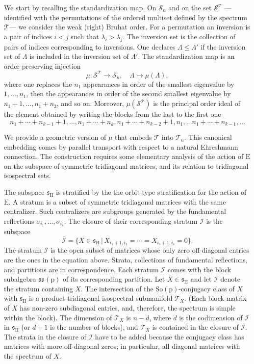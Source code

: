 \documentclass[reqno]{amsart}
\newcommand{\p}{\mathrm{p}}
\renewcommand{\ss}{\mathfrak{s}}
\newcommand{\so}{\mathfrak{so}}
\newcommand{\cI}{\mathcal{I}}
\newcommand{\cS}{\mathcal{S}}
\newcommand{\cT}{\mathcal{T}}
\newcommand{\E}{\mathrm{E}}
\newcommand{\So}{\mathrm{So}}
\renewcommand{\H}{\mathrm{H}}
\begin{document}
We start by recalling the standardization map.
On $\cS_n$ and on the set $\mathcal{S}^{\cT}$ ---identified with the  permutations of the ordered multiset defined by the spectrum  $\cT$--- we consider the weak (right) Bruhat order. For a permutation an inversion is a pair of indices $i<j$ such that $\lambda_i>\lambda_j$. The inversion set is the collection of pairs of indices corresponding to inversions. One declares $\Lambda\leq \Lambda'$ if the inversion set of $\Lambda$ is included in the inversion set of $\Lambda'$.  The standardization map   \cite[Theorem 8]{BB}  is an order preserving injection
\begin{equation}\label{eq:order-embdedding}
\mu: \cS^{\cT}\to \mathcal{S}_{n},\quad \Lambda\mapsto  \mu(\Lambda),
\end{equation}
where one replaces the $n_1$ appearances in order of the smallest eigenvalue by $1,\dots,n_1$, then the appearances in order of the second smallest eigenvalue by $n_1+1,\dots, n_1+n_2$, and so on.
Moreover, $\mu(\mathcal{S}^{\cT})$ is the  principal order ideal of the element obtained by writing the blocks from the last to the first one
\[n_1+\cdots +n_{k-1}+1,\dots ,n_1+\cdots +n_{k},n_1+\cdots +n_{k-2}+1,n_1,\dots n_1+\cdots +n_{k-1},\dots\]

We provide a geometric version of $\mu$ that  embeds $\cT$ into $\cT_{n}$. This canonical embedding  comes by parallel transport with respect to a natural Ehreshmann connection. The construction requires some elementary analysis of the action of $\E$ on the subspace of symmetric tridiagonal matrices, and its relation to tridiagonal isospectral sets.

The subspace $\ss_\H$ is stratified by the the orbit type stratification for the action of $\E$. A stratum is a subset of
 symmetric tridiagonal matrices with the same centralizer. Such centralizers are subgroups generated by the fundamental reflections $\sigma_{i_1},\dots,\sigma_{i_s}$. The closure of their corresponding stratum $\cI$ is the subspace
 \[\overline{\cI}=\{X\in \ss_\H\,|\, X_{i_1+1,i_1}=\cdots =X_{i_s+1,i_s}=0\}.\]
 The stratum $\cI$ is the open subset of matrices whose only zero off-diagonal entries are the ones in the equation above.
Strata, collections of fundamental reflections, and partitions are in correspondence.  Each stratum $\cI$ comes with the block subalgebra $\so(\p)$ of its corresponding partition.
Let $X\in \ss_\H$ and let $\cI$ denote the stratum containing $X$. The intersection
of the $\So(\p)$-conjugacy class of $X$ with $\ss_\H$ is a product tridiagonal isospectral submanifold $\cT_X$. (Each block matrix of $X$ has non-zero subdiagonal entries, and, therefore, the spectrum is simple within the block). The dimension of $\cT_X$ is $n-d$, where $d$ is the codimension of $\cI$ in $\ss_\H$ (or  $d+1$ is the number of blocks), and $\cT_X$ is contained in the closure of $\cI$. The strata in the closure of $\cI$ have to be added because the conjugacy class has matrices with more off-diagonal zeros; in particular, all diagonal matrices with the spectrum of $X$.
\end{document}
